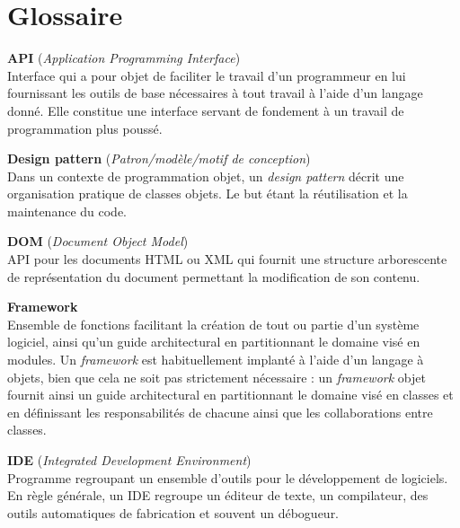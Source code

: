 \chapter*{Glossaire}
\pagestyle{empty}

\textbf{API} (\textit{Application Programming Interface})\\
Interface qui a pour objet de faciliter le travail d'un programmeur en lui fournissant les outils de base n\'ecessaires \`a tout travail \`a l'aide d'un langage donn\'e.
Elle constitue une interface servant de fondement \`a un travail de programmation plus pouss\'e.

\vspace{0.5cm}

\textbf{Design pattern} (\textit{Patron/mod\`ele/motif de conception})\\
Dans un contexte de programmation objet, un \textit{design pattern} d\'ecrit une organisation pratique de classes objets. 
Le but \'etant la r\'eutilisation et la maintenance du code.

\vspace{0.5cm}

\textbf{DOM} (\textit{Document Object Model})\\
API pour les documents HTML ou XML qui fournit une structure arborescente de repr\'esentation du document permettant la modification de son contenu.

\vspace{0.5cm}

\textbf{Framework}\\
Ensemble de fonctions facilitant la cr\'eation de tout ou partie d'un syst\`eme logiciel, ainsi qu'un guide architectural en partitionnant le domaine vis\'e en modules. 
Un \textit{framework} est habituellement implant\'e \`a l'aide d'un langage \`a objets, bien que cela ne soit pas strictement n\'ecessaire : un \textit{framework} objet fournit ainsi un guide architectural en partitionnant le domaine vis\'e en classes et en d\'efinissant les responsabilit\'es de chacune ainsi que les collaborations entre classes. 

\vspace{0.5cm}

\textbf{IDE} (\textit{Integrated Development Environment})\\
Programme regroupant un ensemble d'outils pour le d\'eveloppement de logiciels.
En r\`egle g\'en\'erale, un IDE regroupe un \'editeur de texte, un compilateur, des outils automatiques de fabrication et souvent un d\'ebogueur.

